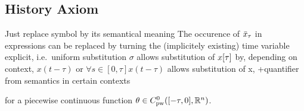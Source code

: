 \documentclass[10pt]{report}
\begin{document}
    \begin{calculus}

    \end{calculus}



    \subsection{History Axiom}
        \label{history-axiom}

        Just replace symbol by its semantical meaning
        The occurence of $\bar{x}_{\tau}$ in expressions can be replaced by turning the (implicitely existing) time variable explicit, i.e.\
        uniform substitution $\sigma$
        allows substitution of $x[\tau]$ by, depending on context, $x(t-\tau)$ or $\forall{s\in[0,\tau]}{x(t-\tau)}$
        allows substitution of x, +quantifier from semantics in certain contexts
        \begin{calculus}
        \end{calculus}
        for a piecewise continuous function $\theta\in\statespace$.
\end{document}
